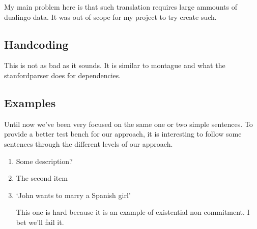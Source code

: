 \documentclass[12pt]{article}
\begin{document}
My main problem here is that such translation requires large ammounts of dualingo data. It was out of scope for my project to try create such.

\subsection{Handcoding}
This is not as bad as it sounds. It is similar to montague and what the stanfordparser does for dependencies.

\subsection{Examples}
Until now we've been very focused on the same one or two simple sentences. To provide a better test bench for our approach, it is interesting to follow some sentences through the different levels of our approach.

\begin{enumerate}
\item
Some description?

\item The second item
\item
`John wants to marry a Spanish girl'

This one is hard because it is an example of existential non commitment. I bet we'll fail it.
\end{enumerate}
\end{document}
